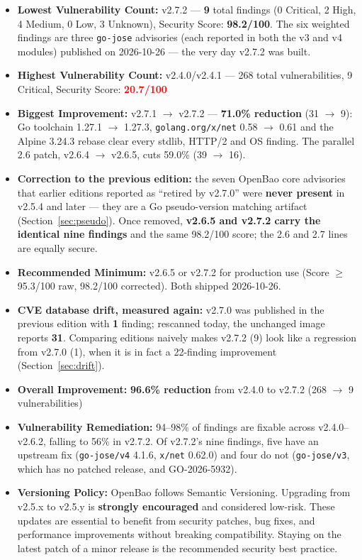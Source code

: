 \documentclass{article}
\begin{document}
\begin{itemize}
    \item \textbf{Lowest Vulnerability Count:} v2.7.2 --- \textbf{9} total findings (0 Critical, 2 High, 4 Medium, 0 Low, 3 Unknown), Security Score: \textcolor{green!60!black}{\textbf{98.2/100}}. The six weighted findings are three \texttt{go-jose} advisories (each reported in both the v3 and v4 modules) published on 2026-10-26 --- the very day v2.7.2 was built.
    \item \textbf{Highest Vulnerability Count:} v2.4.0/v2.4.1 --- 268 total vulnerabilities, 9 Critical, Security Score: \textcolor{red}{\textbf{20.7/100}}
    \item \textbf{Biggest Improvement:} v2.7.1 $\rightarrow$ v2.7.2 --- \textbf{71.0\% reduction} (31 $\rightarrow$ 9): Go toolchain 1.27.1 $\rightarrow$ 1.27.3, \texttt{golang.org/x/net} 0.58 $\rightarrow$ 0.61 and the Alpine 3.24.3 rebase clear every stdlib, HTTP/2 and OS finding. The parallel 2.6 patch, v2.6.4 $\rightarrow$ v2.6.5, cuts 59.0\% (39 $\rightarrow$ 16).
    \item \textbf{Correction to the previous edition:} the seven OpenBao core advisories that earlier editions reported as ``retired by v2.7.0'' were \textbf{never present} in v2.5.4 and later --- they are a Go pseudo-version matching artifact (Section~\ref{sec:pseudo}). Once removed, \textbf{v2.6.5 and v2.7.2 carry the identical nine findings} and the same 98.2/100 score; the 2.6 and 2.7 lines are equally secure.
    \item \textbf{Recommended Minimum:} v2.6.5 or v2.7.2 for production use (Score $\geq$ 95.3/100 raw, 98.2/100 corrected). Both shipped 2026-10-26.
    \item \textbf{CVE database drift, measured again:} v2.7.0 was published in the previous edition with \textbf{1} finding; rescanned today, the unchanged image reports \textbf{31}. Comparing editions naively makes v2.7.2 (9) look like a regression from v2.7.0 (1), when it is in fact a 22-finding improvement (Section~\ref{sec:drift}).
    \item \textbf{Overall Improvement:} \textbf{96.6\% reduction} from v2.4.0 to v2.7.2 (268 $\rightarrow$ 9 vulnerabilities)
    \item \textbf{Vulnerability Remediation:} 94--98\% of findings are fixable across v2.4.0--v2.6.2, falling to 56\% in v2.7.2. Of v2.7.2's nine findings, five have an upstream fix (\texttt{go-jose/v4} 4.1.6, \texttt{x/net} 0.62.0) and four do not (\texttt{go-jose/v3}, which has no patched release, and GO-2026-5932).
    \item \textbf{Versioning Policy:} OpenBao follows Semantic Versioning. Upgrading from v2.5.x to v2.5.y is \textbf{strongly encouraged} and considered low-risk. These updates are essential to benefit from security patches, bug fixes, and performance improvements without breaking compatibility. Staying on the latest patch of a minor release is the recommended security best practice.
\end{itemize}
\end{document}
